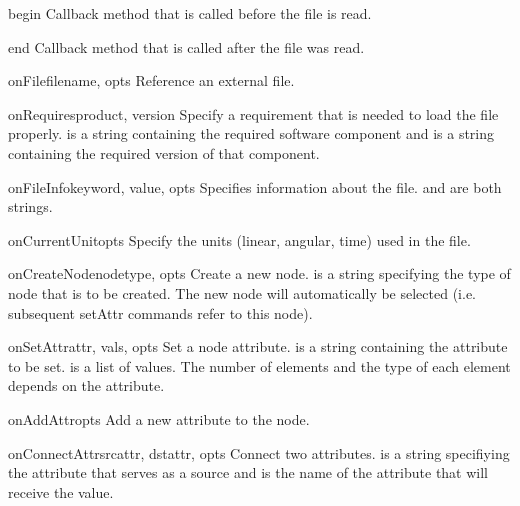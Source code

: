 \begin{methoddesc}{begin}{}
Callback method that is called before the file is read.
\end{methoddesc}

\begin{methoddesc}{end}{}
Callback method that is called after the file was read.
\end{methoddesc}

\begin{methoddesc}{onFile}{filename, opts}
Reference an external file.
\end{methoddesc}

\begin{methoddesc}{onRequires}{product, version}
Specify a requirement that is needed to load the file properly.
 is a string containing the required software component
and  is a string containing the required version of that
component.
\end{methoddesc}

\begin{methoddesc}{onFileInfo}{keyword, value, opts}
Specifies information about the file.  and 
are both strings.
\end{methoddesc}

\begin{methoddesc}{onCurrentUnit}{opts}
Specify the units (linear, angular, time) used in the file.
\end{methoddesc}

\begin{methoddesc}{onCreateNode}{nodetype, opts}
Create a new node.  is a string specifying the type of node
that is to be created. The new node will automatically be selected (i.e.
subsequent setAttr commands refer to this node).
\end{methoddesc}

\begin{methoddesc}{onSetAttr}{attr, vals, opts}
Set a node attribute.  is a string containing the attribute
to be set.  is a list of values. The number of elements and
the type of each element depends on the attribute.
\end{methoddesc}

\begin{methoddesc}{onAddAttr}{opts}
Add a new attribute to the node.
\end{methoddesc}

\begin{methoddesc}{onConnectAttr}{srcattr, dstattr, opts}
Connect two attributes.  is a string specifiying the
attribute that serves as a source and  is the name of
the attribute that will receive the value. 
\end{methoddesc}

